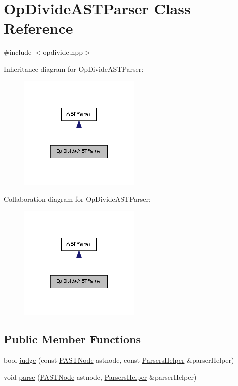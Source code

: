 \hypertarget{class_op_divide_a_s_t_parser}{}\section{Op\+Divide\+A\+S\+T\+Parser Class Reference}
\label{class_op_divide_a_s_t_parser}


{\ttfamily \#include $<$opdivide.\+hpp$>$}



Inheritance diagram for Op\+Divide\+A\+S\+T\+Parser\+:
\nopagebreak
\begin{figure}[H]
\begin{center}
\leavevmode
\includegraphics[width=166pt]{class_op_divide_a_s_t_parser__inherit__graph}
\end{center}
\end{figure}


Collaboration diagram for Op\+Divide\+A\+S\+T\+Parser\+:
\nopagebreak
\begin{figure}[H]
\begin{center}
\leavevmode
\includegraphics[width=166pt]{class_op_divide_a_s_t_parser__coll__graph}
\end{center}
\end{figure}
\subsection*{Public Member Functions}
\begin{DoxyCompactItemize}
\item 
bool \hyperlink{class_op_divide_a_s_t_parser_ad1259683c9e5fcb0c243a9c002d6835b}{judge} (const \hyperlink{ast_8hpp_ab65291a3ef1ea9ec8e3d396783b77e46}{P\+A\+S\+T\+Node} astnode, const \hyperlink{class_parsers_helper}{Parsers\+Helper} \&parser\+Helper)
\item 
void \hyperlink{class_op_divide_a_s_t_parser_ac6f5f2861b13513887621304f5d2ac6d}{parse} (\hyperlink{ast_8hpp_ab65291a3ef1ea9ec8e3d396783b77e46}{P\+A\+S\+T\+Node} astnode, \hyperlink{class_parsers_helper}{Parsers\+Helper} \&parser\+Helper)
\end{DoxyCompactItemize}



